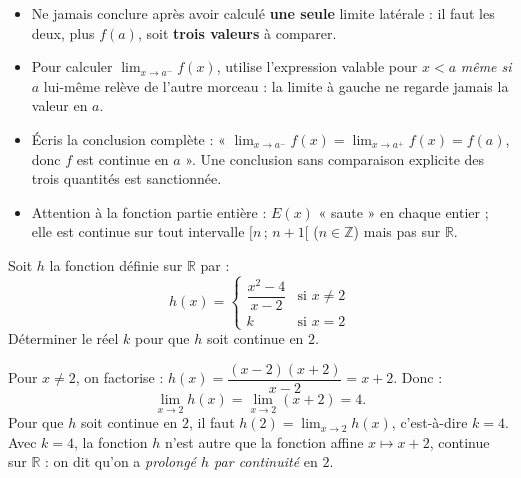 \documentclass[11pt]{article}
\begin{document}
\begin{attention}
\begin{itemize}
\item Ne jamais conclure après avoir calculé \textbf{une seule} limite latérale : il faut les deux, plus $f(a)$, soit \textbf{trois valeurs} à comparer.
\item Pour calculer $\displaystyle\lim_{x\to a^-} f(x)$, utilise l'expression valable pour $x < a$ \emph{même si} $a$ lui-même relève de l'autre morceau : la limite à gauche ne regarde jamais la valeur en $a$.
\item Écris la conclusion complète : « $\displaystyle\lim_{x\to a^-} f(x) = \lim_{x\to a^+} f(x) = f(a)$, donc $f$ est continue en $a$ ». Une conclusion sans comparaison explicite des trois quantités est sanctionnée.
\item Attention à la fonction partie entière : $E(x)$ « saute » en chaque entier ; elle est continue sur tout intervalle $[n\,;\,n+1[$ ($n \in \mathbb{Z}$) mais pas sur $\mathbb{R}$.
\end{itemize}
\end{attention}

\begin{exercice}
Soit $h$ la fonction définie sur $\mathbb{R}$ par :
\[ h(x) = \begin{cases} \dfrac{x^2 - 4}{x - 2} & \text{si } x \neq 2 \\[4pt] k & \text{si } x = 2 \end{cases} \]
Déterminer le réel $k$ pour que $h$ soit continue en $2$.
\end{exercice}

\begin{corrige}
Pour $x \neq 2$, on factorise : $h(x) = \dfrac{(x-2)(x+2)}{x-2} = x + 2$. Donc :
\[ \lim_{x \to 2} h(x) = \lim_{x \to 2} (x+2) = 4. \]
Pour que $h$ soit continue en $2$, il faut $h(2) = \displaystyle\lim_{x\to 2} h(x)$, c'est-à-dire $k = 4$. Avec $k = 4$, la fonction $h$ n'est autre que la fonction affine $x \mapsto x+2$, continue sur $\mathbb{R}$ : on dit qu'on a \emph{prolongé $h$ par continuité} en $2$.
\end{corrige}
\end{document}
